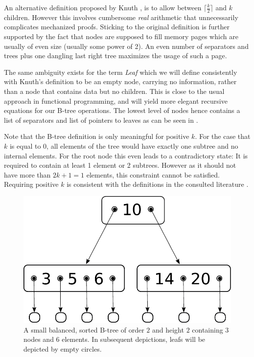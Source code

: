An alternative definition proposed by Knuth \parencite{DBLP:books/lib/Knuth98a},
is to allow between $\lceil \frac{k}{2} \rceil$ and $k$ children.
However this involves cumbersome \textit{real} arithmetic that unnecessarily complicates
mechanized proofs.
Sticking to the original definition is further supported by the fact that nodes are supposed
to fill memory pages which are usually of even size (usually some power of 2).
An even number of separators and trees plus one dangling last right tree maximizes
the usage of such a page.

The same ambiguity exists for the term \textit{Leaf} which we will define consistently with Knuth's definition \parencite{DBLP:books/lib/Knuth98a}
to be an empty node, carrying no information,
rather than a node that contains data but no children.
This is close to the usual approach in functional programming,
and will yield more elegant recursive equations for our B-tree operations.
The lowest level of nodes hence contains a list of separators and
list of pointers to leaves as can be seen in .

Note that the B-tree definition is only meaningful for positive $k$.
For the case that $k$ is equal to 0,
all elements of the tree would have exactly one subtree
and no internal elements.
For the root node this even leads to a contradictory state:
It is required to contain at least 1 element or 2 subtrees.
However as it should not have more than $2k+1 = 1$ elements,
this constraint cannot be satisfied.
Requiring positive $k$ is consistent with the definitions
in the consulted literature \parencite{DBLP:journals/acta/BayerM72,DBLP:journals/csur/Comer79,DBLP:books/daglib/0023376}.


\begin{figure}
    \centering
    \includegraphics[width=0.5\linewidth]{figures/btree-basic-nopair.pdf}
    \caption[A small example B-Tree]{A small balanced, sorted B-tree of order $2$ and
    height $2$ containing $3$ nodes and $6$ elements.
    In subsequent depictions, leafs will be depicted
    by empty circles.}
    \label{fig:btree-basic-nopair}
\end{figure}

